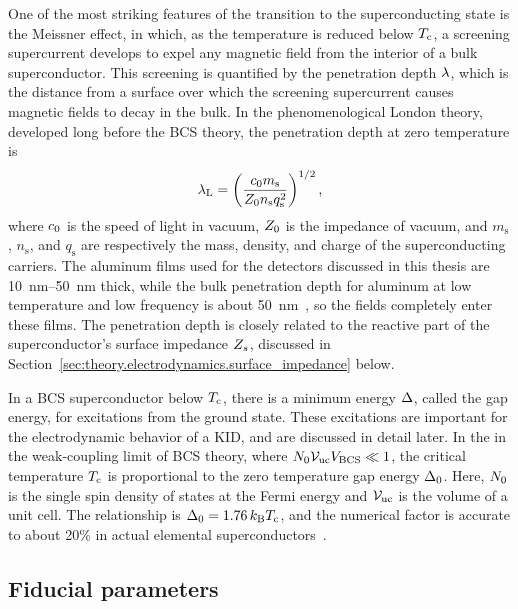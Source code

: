 One of the most striking features of the transition to the superconducting state is the Meissner effect, in which, as the temperature is reduced below $T_{\mathrm{c}}$, a screening supercurrent develops to expel any magnetic field from the interior of a bulk superconductor.
This screening is quantified by the penetration depth $\lambda$, which is the distance from a surface over which the screening supercurrent causes magnetic fields to decay in the bulk.
In the phenomenological London theory, developed long before the BCS theory, the penetration depth at zero temperature is
\begin{equation}
\lambda_\mathrm{L}
  =
  \left( \frac{c_0 m_\mathrm{s}}{Z_0 n_\mathrm{s} q_\mathrm{s}^2}
  \right)^{1/2},
\end{equation}
where $c_0$ is the speed of light in vacuum, $Z_0$ is the impedance of vacuum, and $m_\mathrm{s}$, $n_\mathrm{s}$, and $q_\mathrm{s}$ are respectively the mass, density, and charge of the superconducting carriers.
The aluminum films used for the detectors discussed in this thesis are \SIrange{10}{50}{nm} thick, while the bulk penetration depth for aluminum at low temperature and low frequency is about \SI{50}{nm}~\autocite{Faber1955PRS, Biondi1959bPR}, so the fields completely enter these films. 
The penetration depth is closely related to the reactive part of the superconductor's surface impedance $Z_s$, discussed in Section~\ref{sec:theory.electrodynamics.surface_impedance} below.


In a BCS superconductor below $T_{\mathrm{c}}$, there is a minimum energy $\Delta$, called the gap energy, for excitations from the ground state.
These excitations are important for the electrodynamic behavior of a KID, and are discussed in detail later.
In the in the weak-coupling limit of BCS theory, where
$N_0 \mathcal{V}_\mathrm{uc} V_\mathrm{BCS} \ll 1$,
the critical temperature $T_{\mathrm{c}}$ is proportional to the zero temperature gap energy $\Delta_0$.
Here, $N_0$ is the single spin density of states at the Fermi energy and $\mathcal{V}_\mathrm{uc}$ is the volume of a unit cell.
The relationship is $\Delta_0 = 1.76 \, k_\mathrm{B} T_{\mathrm{c}}$, and the numerical factor is accurate to about 20\% in actual elemental superconductors~\autocite{Tinkham2004}.


\subsection{Fiducial parameters}
\label{sec:theory.ground_state.fiducial}

